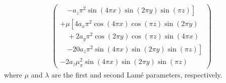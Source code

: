\documentclass[sn-mathphys,Numbered]{sn-jnl}%
\newcommand{\bb}{\boldsymbol}
\begin{document}
\begin{appendices}
\begin{align}
\begin{pmatrix}
        \quad \left. - a_z \pi^2 \sin(4\pi x) \sin(2\pi y) \sin(\pi z)
    \right] \\
    + \mu
    \left[
        4 a_x \pi^2 \cos(4\pi x) \cos(\pi z) \sin(2\pi y) \right. \\
        \quad + 2 a_y \pi^2 \cos(2\pi y) \cos(\pi z) \sin(4\pi x) \\
        \quad \left. - 20 a_z \pi^2 \sin(4\pi x) \sin(2\pi y) \sin(\pi z)
    \right] \\
    - 2 a_z \mu_ \pi^2 \sin(4\pi x) \sin(2\pi y) \sin(\pi z)
    \end{pmatrix}
\end{align}
where $\mu$ and $\lambda$ are the first and second Lam\'{e} parameters, respectively.

\end{appendices}


\end{document}
